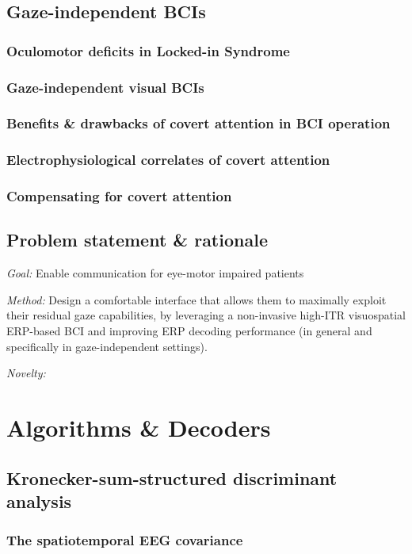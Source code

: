\chapter{Gaze-independent BCIs}
\section{Oculomotor deficits in Locked-in Syndrome}
\section{Gaze-independent visual BCIs}
\section{Benefits \& drawbacks of covert attention in BCI operation}
\section{Electrophysiological correlates of covert attention}
\section{Compensating for covert attention}

\chapter{Problem statement \& rationale}
\emph{Goal:} Enable communication for eye-motor impaired patients

\emph{Method:} Design a comfortable interface that allows them to maximally exploit
their residual gaze capabilities, by leveraging a non-invasive high-ITR
visuospatial ERP-based BCI and improving ERP decoding performance (in general
and specifically in gaze-independent settings).

\emph{Novelty:}


\part{Algorithms \& Decoders}


\chapter{Kronecker-sum-structured discriminant analysis}
\section{The spatiotemporal EEG covariance}
